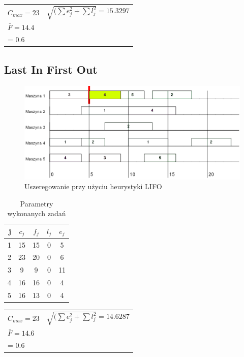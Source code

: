 \documentclass[twoside]{kInzynierka}
\begin{document}
\begin{table}[htb]
	\centering
	\begin{tabular}{ l l }
	\(C_{max} = 23 \)	& \(\sqrt{(\sum e_j^2 + \sum l_j^2} = 15.3297\)	\\
	\(\bar{F} = 14.4 \)	& \( \alpha*\sum e_j + \beta*\sum l_j \Big|_{\substack{\alpha = 0.4\\ \beta = 0.6}} = 12.4 \)	\\ 
	\end{tabular}
\end{table}
	
\FloatBarrier
\newpage
\subsection{Last In First Out}

\begin{figure}[htb]
    \centering
    \includegraphics[width=\textwidth, keepaspectratio=true]{./obrazki/lifo}
    \caption{Uszeregowanie przy użyciu heurystyki LIFO}
\end{figure}

\begin{table}[htb]
	\centering
	\caption{Parametry wykonanych zadań}
	\begin{tabular}{ | r | c | c | c | c |}
	\hline
	j	& \(c_j\)	& \(f_j\)	& \(l_j\)	& \(e_j\)	\\ \hline
	1	& 15	& 15	& 0	& 5	\\ \hline
	2	& 23	& 20	& 0	& 6	\\ \hline
	3	& 9	& 9	& 0	& 11	\\ \hline
	4	& 16	& 16	& 0	& 4	\\ \hline
	5	& 16	& 13	& 0	& 4	\\ \hline
	\end{tabular}
\end{table}

\begin{table}[htb]
	\centering
	\begin{tabular}{ l l }
	\(C_{max} = 23 \)	& \(\sqrt{(\sum e_j^2 + \sum l_j^2} = 14.6287\)	\\
	\(\bar{F} = 14.6 \)	& \( \alpha*\sum e_j + \beta*\sum l_j \Big|_{\substack{\alpha = 0.4\\ \beta = 0.6}} = 12 \)	\\ 
	\end{tabular}
\end{table}
   
\end{document}
